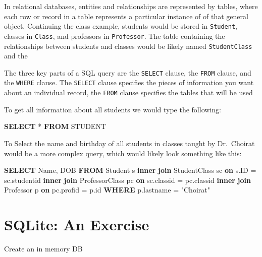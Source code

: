 \documentclass[]{book}
\newenvironment{Shaded}{\begin{snugshade}}{\end{snugshade}}
\newcommand{\KeywordTok}[1]{\textcolor[rgb]{0.13,0.29,0.53}{\textbf{#1}}}
\newcommand{\OtherTok}[1]{\textcolor[rgb]{0.56,0.35,0.01}{#1}}
\newcommand{\NormalTok}[1]{#1}
\theoremstyle{definition}
\theoremstyle{definition}
\theoremstyle{definition}
\theoremstyle{remark}
\begin{document}
In relational databases, entities and relationships are represented by
tables, where each row or record in a table represents a particular
instance of of that general object. Continuing the class example,
students would be stored in \texttt{Student}, classes in \texttt{Class},
and professors in \texttt{Professor}. The table containing the
relationships between students and classes would be likely named
\texttt{StudentClass} and the

The three key parts of a SQL query are the \texttt{SELECT} clause, the
\texttt{FROM} clause, and the \texttt{WHERE} clause. The \texttt{SELECT}
clause specifies the pieces of information you want about an individual
record, the \texttt{FROM} clause specifies the tables that will be used

To get all information about all students we would type the following:

\begin{Shaded}
\begin{Highlighting}[]
\KeywordTok{SELECT}\NormalTok{ * }\KeywordTok{FROM}\NormalTok{ STUDENT}
\end{Highlighting}
\end{Shaded}

To Select the name and birthday of all students in classes taught by
Dr.~Choirat would be a more complex query, which would likely look
something like this:

\begin{Shaded}
\begin{Highlighting}[]
   \KeywordTok{SELECT}\NormalTok{ Name,}
\NormalTok{          DOB}
   \KeywordTok{FROM}\NormalTok{ Student s }
        \KeywordTok{inner} \KeywordTok{join}\NormalTok{ StudentClass sc }\KeywordTok{on} 
\NormalTok{            s.ID = sc.studentid}
        \KeywordTok{inner} \KeywordTok{join}\NormalTok{ ProfessorClass pc }\KeywordTok{on}
\NormalTok{            sc.classid = pc.classid}
        \KeywordTok{inner} \KeywordTok{join}\NormalTok{ Professor p }\KeywordTok{on}
\NormalTok{            pc.profid = p.id}
    \KeywordTok{WHERE}\NormalTok{ p.lastname = }\OtherTok{"Choirat"}
\end{Highlighting}
\end{Shaded}

\section{SQLite: An Exercise}\label{sqlite-an-exercise}

Create an in memory DB
\end{document}
